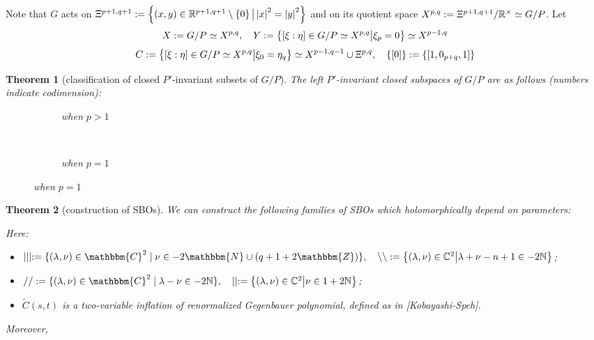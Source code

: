 \documentclass[10pt]{article} %
\newcommand{\assign}{:=}
\newtheorem{theorem}{Theorem}
\theoremstyle{definition}
\begin{document}
Note that $G$ acts on $\Xi^{p+1,q+1}:=\left\{(x,y)\in\mathbb{R}^{p+1,q+1}\setminus\left\{ 0 \right\}\big| \left|x\right|^2=\left|y\right|^2\right\}$ and on its quotient space
$X^{p,q}:=\Xi^{p+1,q+1}/\mathbb{R}^{\times}\simeq G/P$. Let
\[
	X:=G/P\simeq X^{p,q},\quad Y:=\left\{[\xi:\eta]\in G/P\simeq X^{p,q}\big| \xi_{p}=0\right\}\simeq X^{p-1,q}\]
	\[C:=\left\{[\xi:\eta]\in G/P\simeq X^{p,q}\big| \xi_{0}=\eta_q\right\}\simeq X^{p-1,q-1}\cup\Xi^{p,q},\quad\left\{ [0] \right\}:=\left\{ [1,0_{p+q},1] \right\}\]
\begin{theorem}[classification of closed $P'$-invariant subsets of $G/P$]
	The left $P'$-invariant closed subspaces of $G/P$ are as follows (numbers indicate codimension):\\
  \begin{figure}[H]
    \centering
    \begin{subfigure}[t]{0.3\textwidth}
	    \xymatrixrowsep{0.5pc}
	\caption{when $p>1$}
    \end{subfigure}
    ~ %
    \begin{subfigure}[t]{0.3\textwidth}
	    \xymatrixrowsep{0.5pc}
	    {}
	\caption{when $p=1$}
    \end{subfigure}
\end{figure}
\end{theorem}
\begin{theorem}[construction of SBOs]
We can construct the following families of SBOs which holomorphically depend on parameters:\\

Here:
\begin{itemize}
	\item $\mid \mid \mid \assign \{ (\lambda, \nu) \in \mathbbm{C}^2 \mid \nu \in
	- 2\mathbbm{N} \cup (q + 1 + 2\mathbbm{Z}) \},\quad \backslash\backslash:=\mysetn{(\lambda,\nu)\in\C^2}{\lambda+\nu-n+1\in-2\N}$;
\item $/ / \assign
\{ (\lambda, \nu) \in \mathbbm{C}^2 \mid \lambda - \nu \in
-2\N \},\quad \mid\mid:=\mysetn{(\lambda,\nu)\in\C^2}{\nu\in1+2\N}$;
\item $\tilde{C}(s,t)$ is a two-variable inflation of renormalized Gegenbauer polynomial, defined as in [Kobayashi-Speh].
\end{itemize}
Moreover,\\
\end{theorem}
\end{document}
